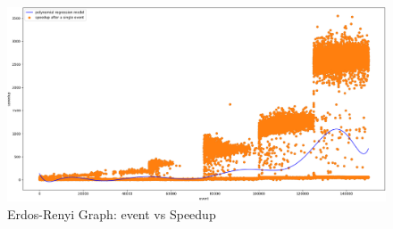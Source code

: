 \documentclass[a4paper]{article}
\begin{document}
\begin{figure}[!h]
\includegraphics[scale=0.29]{img/ERG_F3_Event-Speedup}
\centering
\caption{Erdos-Renyi Graph: event vs Speedup}
\end{figure}
\newpage
\end{document}
